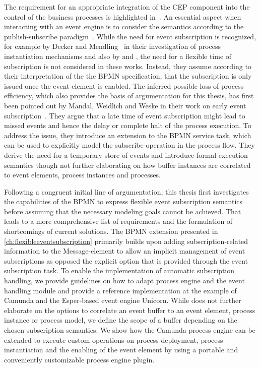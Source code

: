 The requirement for an appropriate integration of the CEP component into the control of the business processes is highlighted in~\cite{chandy2010event}.
An essential aspect when interacting with an event engine is to consider the semantics according to the publish-subscribe paradigm~\cite{luckham2008power}. 
While the need for event subscription is recognized, for example by Decker and Mendling~\cite{decker2008instantiation} in their investigation of process instantiation mechanisms and also by \cite{Pufahl2017} and \cite{von2010integrating}, the need for a flexible time of subscription is not considered in these works.
Instead, they assume according to their interpretation of the the \acs{BPMN} specification, that the subscription is only issued once the event element is enabled.
The inferred possible loss of process efficiency, which also provides the basis of argumentation for this thesis, has first been pointed out by Mandal, Weidlich and Weske in their work on early event subscription~\cite{mandal:2017}.
They argue that a late time of event subscription might lead to missed events and hence the delay or complete halt of the process execution. To address the issue, they introduce an extension to the BPMN service task, which can be used to explicitly model the subscribe-operation in the process flow. They derive the need for a temporary store of events and introduce formal execution semantics though not further elaborating on how buffer instances are correlated to event elements, process instances and processes.

Following a congruent initial line of argumentation, this thesis first investigates the capabilities of the BPMN to express flexible event subscription semantics before assuming that the necessary modeling goals cannot be achieved. That leads to a more comprehensive list of requirements and the formulation of shortcomings of current solutions.
The BPMN extension presented in \autoref{ch:flexibleeventsubscription} primarily builds upon adding subscription-related information to the Message-element to allow an implicit management of event subscriptions as opposed the explicit option that is provided through the event subscription task.
To enable the implementation of automatic subscription handling, we provide guidelines on how to adapt process engine and the event handling module and provide a reference implementation at the example of Camunda and the Esper-based event engine Unicorn.
While \cite{mandal:2017} does not further elaborate on the options to correlate an event buffer to an event element, process instance or process model, we define the scope of a buffer depending on the chosen subscription semantics.
We show how the Camunda process engine can be extended to execute custom operations on process deployment, process instantiation and the enabling of the event element by using a portable and conveniently customizable process engine plugin. %

